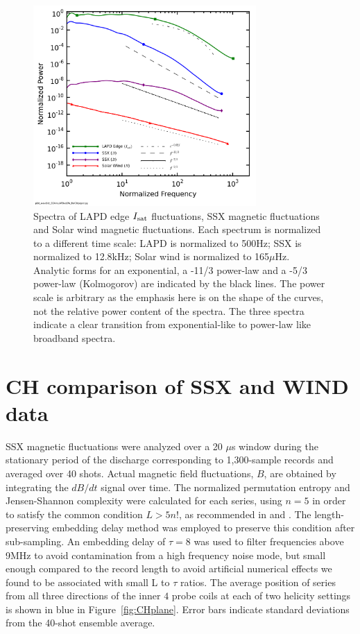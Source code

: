 \documentclass[aps,pre,twocolumn,secnumarabic,nobalancelastpage,amsmath,amssymb,
nofootinbib]{revtex4-1}
\begin{document}
%
\begin{figure}[!htbp]
\centerline{
\includegraphics[width=8.5cm]{spectra.png}}
\caption{\label{fig:spectra} Spectra of LAPD edge $I_{\rm sat}$ fluctuations, SSX magnetic fluctuations and Solar wind magnetic fluctuations. Each spectrum is normalized to a different time scale: LAPD is normalized to 500Hz; SSX is normalized to 12.8kHz; Solar wind is normalized to 165$\mu$Hz. Analytic forms for an exponential, a -11/3 power-law and a -5/3 power-law (Kolmogorov) are indicated by the black lines. The power scale is arbitrary as the emphasis here is on the shape of the curves, not the relative power content of the spectra. The three spectra indicate a clear transition from exponential-like to power-law like broadband spectra.}
\end{figure}
%
\section{CH comparison of SSX and WIND data}
SSX magnetic fluctuations were analyzed over a 20 $\mu$s window during the stationary period of the discharge corresponding to 1,300-sample records and averaged over 40 shots. Actual magnetic field fluctuations, $B$, are obtained by integrating the $dB/dt$ signal over time. The normalized permutation entropy and Jensen-Shannon complexity were calculated for each series, using $n=5$ in order to satisfy the common condition $L > 5n!$, as recommended in \cite{amigo2008} and \cite{riedl2013}. The length-preserving embedding delay method was employed to preserve this condition after sub-sampling. An embedding delay of $\tau=8$ was used to filter frequencies above 9MHz to avoid contamination from a high frequency noise mode, but small enough compared to the record length to avoid artificial numerical effects we found to be associated with small L to $\tau$ ratios. The average position of series from all three directions of the inner $4$ probe coils at each of two helicity settings is shown in blue in Figure~\ref{fig:CHplane}. Error bars indicate standard deviations from the 40-shot ensemble average.  
\end{document}
